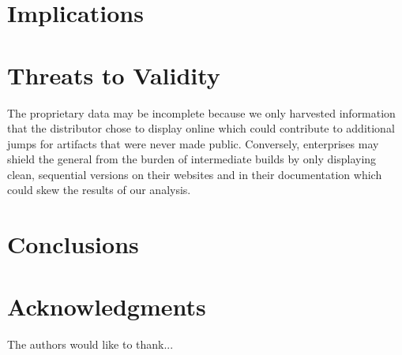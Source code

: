 \documentclass[conference]{IEEEtran}
\begin{document}
\section{Implications}

\section{Threats to Validity}

 The proprietary data may be incomplete because we only harvested information that the distributor chose to display online which could contribute to additional jumps for artifacts that were never made public. Conversely, enterprises may shield the general from the burden of intermediate builds by only displaying clean, sequential versions on their websites and in their documentation which could skew the results of our analysis.





\section{Conclusions}


\section*{Acknowledgments}

The authors would like to thank...

%

\end{document}
